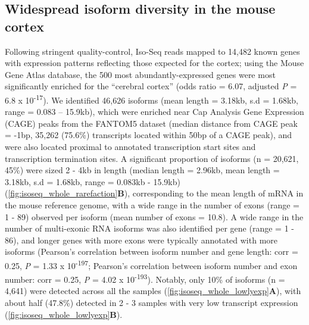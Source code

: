 \subsection{Widespread isoform diversity in the mouse cortex}
Following stringent quality-control, Iso-Seq reads mapped to 14,482 known genes with expression patterns reflecting those expected for the cortex; using the Mouse Gene Atlas database, the 500 most abundantly-expressed genes were most significantly enriched for the “cerebral cortex” (odds ratio = 6.07, adjusted \textit{P} = 6.8 x 10\textsuperscript{-17}). We identified 46,626 isoforms (mean length = 3.18kb, s.d = 1.68kb, range = 0.083 – 15.9kb), which were enriched near Cap Analysis Gene Expression (CAGE) peaks from the FANTOM5 dataset (median distance from CAGE peak = -1bp, 35,262 (75.6\%) transcripts located within 50bp of a CAGE peak), and were also located proximal to annotated transcription start sites and transcription termination sites. A significant proportion of isoforms (n = 20,621, 45\%) were sized 2 - 4kb in length (median length = 2.96kb, mean length = 3.18kb, s.d = 1.68kb, range = 0.083kb - 15.9kb) (\cref{fig:isoseq_whole_rarefaction}\textbf{B}), corresponding to the mean length of mRNA in the mouse reference genome, with a wide range in the number of exons (range = 1 - 89) observed per isoform (mean number of exons = 10.8). A wide range in the number of multi-exonic RNA isoforms was also identified per gene (range = 1 - 86), and longer genes with more exons were typically annotated with more isoforms (Pearson's correlation between isoform number and gene length: corr = 0.25, \textit{P} = 1.33 x 10\textsuperscript{-197}; Pearson's correlation between isoform number and exon number: corr = 0.25, \textit{P} = 4.02 x 10\textsuperscript{-193}). Notably, only 10\% of isoforms (n = 4,641) were detected across all the samples (\cref{fig:isoseq_whole_lowlyexp}\textbf{A}), with about half (47.8\%) detected in 2 - 3 samples with very low transcript expression (\cref{fig:isoseq_whole_lowlyexp}\textbf{B}). 

